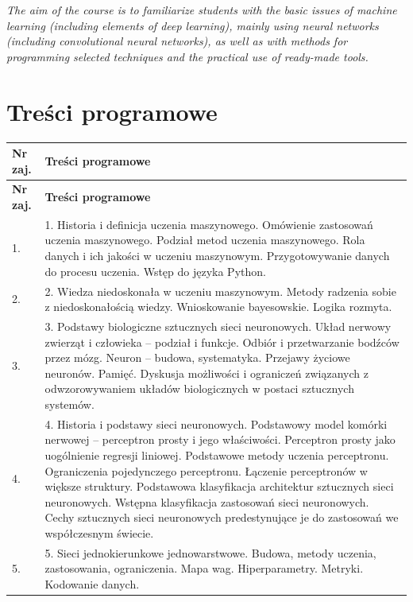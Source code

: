 \documentclass[12pt, a4paper]{article}
\newcommand{\thdrule}{\noalign{\global\setlength{\extrarowheight}{0pt}}}
\newcommand{\thdend}{\noalign{\global\setlength{\extrarowheight}{3pt}}}
\begin{document}
\textit{The aim of the course is to familiarize students with the basic issues of machine learning (including elements of deep learning), mainly using neural networks (including convolutional neural networks), as well as with methods for programming selected techniques and the practical use of ready-made tools.}


\section{Treści programowe}

{\scriptsize
\begin{longtable}{m{1.5cm}m{14.5cm}}
\thdrule\toprule
\rowcolor{pjatkRed} {\color{white}\textbf{Nr zaj.}} & {\color{white}\textbf{Treści programowe}} \\
\midrule\thdend
\endfirsthead
\thdrule\toprule
\rowcolor{pjatkRed} {\color{white}\textbf{Nr zaj.}} & {\color{white}\textbf{Treści programowe}} \\
\midrule\thdend
\endhead
  \rowcolor{tableRowLight} 1. & 1.  Historia i definicja uczenia maszynowego. Omówienie zastosowań uczenia maszynowego. Podział metod uczenia maszynowego. Rola danych i ich jakości w uczeniu maszynowym. Przygotowywanie danych do procesu uczenia. Wstęp do języka Python. \\
  \rowcolor{tableRowAlt} 2. & 2.  Wiedza niedoskonała w uczeniu maszynowym. Metody radzenia sobie z niedoskonałością wiedzy. Wnioskowanie bayesowskie. Logika rozmyta. \\
  \rowcolor{tableRowLight} 3. & 3. Podstawy biologiczne sztucznych sieci neuronowych. Układ nerwowy zwierząt i człowieka –  podział i funkcje. Odbiór i przetwarzanie bodźców przez mózg. Neuron – budowa, systematyka. Przejawy życiowe neuronów. Pamięć.  Dyskusja możliwości i ograniczeń związanych z odwzorowywaniem układów biologicznych w postaci sztucznych systemów. \\
  \rowcolor{tableRowAlt} 4. & 4.  Historia i podstawy sieci neuronowych. Podstawowy model komórki nerwowej – perceptron prosty i jego właściwości. Perceptron prosty jako uogólnienie regresji liniowej. Podstawowe metody uczenia perceptronu. Ograniczenia pojedynczego perceptronu. Łączenie perceptronów w większe struktury. Podstawowa klasyfikacja architektur sztucznych sieci neuronowych. Wstępna klasyfikacja zastosowań sieci neuronowych. Cechy sztucznych sieci neuronowych predestynujące je do zastosowań we współczesnym świecie. \\
  \rowcolor{tableRowLight} 5. & 5.  Sieci jednokierunkowe jednowarstwowe. Budowa, metody uczenia, zastosowania, ograniczenia. Mapa wag.  Hiperparametry. Metryki. Kodowanie danych. \\

\end{longtable}}
\end{document}
